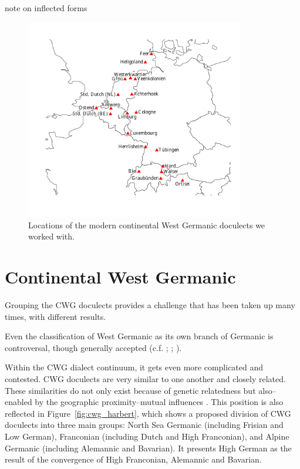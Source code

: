\documentclass[a4paper]{article}
\begin{document}
note on inflected forms

\begin{figure}[h]
\centering
\includegraphics[width=0.85\textwidth]{figures/map.pdf}
\caption{Locations of the modern continental West Germanic doculects we worked with.}
\label{fig:map}
\end{figure}


\newpage
\section{Continental West Germanic}
\label{sec:cwg}

Grouping the CWG doculects provides a challenge
that has been taken up many times, with different results.

Even the classification of West Germanic
as its own branch of Germanic is controversal,
though generally accepted
(c.f. \citet{voyles1971problem}; \citet[pp. 7-8]{harbert2007germanic}; \citet{ringe2012cladistic}). %

Within the CWG dialect continuum, it gets even more complicated and contested.
CWG doculects are very similar to one another and closely related.
These similarities do not only exist because of genetic relatedness
but also--enabled by the geographic proximity--mutual influences
\citep[p. 8]{harbert2007germanic}.
This position is also reflected in Figure~\ref{fig:cwg_harbert},
which shows a proposed division of CWG doculects
into three main groups: North Sea Germanic (including Frisian and Low German),
Franconian (including Dutch and High Franconian),
and Alpine Germanic (including Alemannic and Bavarian).
It presents High German as the result of the convergence
of High Franconian, Alemannic and Bavarian.
\end{document}
